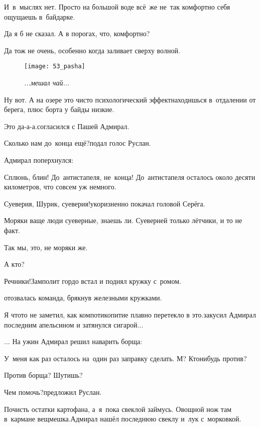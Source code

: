 \diagdash И~в~мыслях нет. Просто на большой воде всё~же не~так комфортно себя ощущаешь в~байдарке.

\diagdash Да я б не сказал. А в порогах, что, комфортно?

\diagdash Да тож не очень, особенно когда заливает сверху волной.

\begin{wrapfigure}[17]{l}{0.50\textwidth}
	\centering
	\texttt{[image: 53\_pasha]}
	\caption{\small\textit{...мешал чай...}}
\end{wrapfigure}
\diagdash Ну вот. А на озере это чисто психологический эффект\mdash находишься в~отдалении от берега, плюс борта у байды низкие.

\diagdash Это да-а-а.\mdash согласился с Пашей Адмирал.

\diagdash Сколько нам до~конца ещё?\mdash подал голос Руслан.

Адмирал поперхнулся:

\diagdash Сплюнь, блин! До~антистапеля, не~конца! До~антистапеля осталось около десяти километров, что совсем уж немного.

\diagdash Суеверия, Шурик, суеверия!\mdash укоризненно покачал головой Серёга.

\diagdash Моряки ваще люди суеверные, знаешь ли. Суеверней только лётчики, и то не факт.

\diagdash Так мы, это, не моряки же.

\diagdash А кто?

\diagdash Речники!\mdash Замполит гордо встал и поднял кружку с~ромом.

\mdash отозвалась команда, брякнув железными кружками.

\diagdash Я что\sdash то не заметил, как компотикопитие плавно перетекло в это.\mdash закусил Адмирал последним апельсином и затянулся сигарой$\ldots$

$\ldots$ На ужин Адмирал решил наварить борща:

\diagdash У~меня как раз осталось на~один раз заправку сделать. М? Кто\sdash нибудь против?

\diagdash Против борща? Шутишь?

\diagdash Чем помочь?\mdash предложил Руслан.

\diagdash Почисть остатки картофана, а~я~пока свеклой займусь. Овощной нож там в~кармане вещмешка.\mdash Адмирал нашёл последнюю свеклу и~лук с~морковкой.

